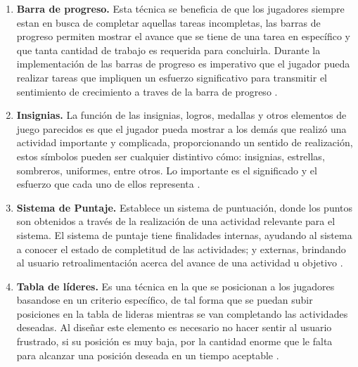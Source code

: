    \begin{enumerate} 
    \item
    {\bf Barra de progreso.}
        Esta técnica se beneficia de que los jugadores siempre estan en busca de completar aquellas
        tareas incompletas, las barras de progreso permiten mostrar el avance que se tiene de una
        tarea en específico y que tanta cantidad de trabajo es requerida para concluirla. Durante la
        implementación de las barras de progreso es imperativo que el jugador pueda realizar tareas que
        impliquen un esfuerzo significativo para transmitir el sentimiento de crecimiento a traves de
        la barra de progreso \cite[p. 113]{Octalysis}.
        
    \item
    {\bf Insignias.}
        La función de las insignias, logros, medallas y otros elementos de juego parecidos es que el
        jugador pueda mostrar a los demás que realizó una actividad importante y complicada, proporcionando
        un sentido de realización, estos símbolos pueden ser cualquier distintivo cómo: insignias,
        estrellas, sombreros, uniformes, entre otros. Lo importante es el significado y el esfuerzo
        que cada uno de ellos representa \cite[p. 117]{Octalysis}.
        
    \item
    {\bf Sistema de Puntaje.}%
        Establece un sistema de puntuación, donde los puntos son obtenidos a través de la realización
        de una actividad relevante para el sistema. El sistema de puntaje tiene finalidades internas,
        ayudando al sistema a conocer el estado de completitud de las actividades; y externas, brindando
        al usuario retroalimentación acerca del avance de una actividad u objetivo \cite[p. 118]{Octalysis}. 
        
    \item
    {\bf Tabla de líderes.}
        Es una técnica en la que se posicionan a los jugadores basandose en un criterio específico,
        de tal forma que se puedan subir posiciones en la tabla de lideras mientras se van completando
        las actividades deseadas. Al diseñar este elemento es necesario no hacer sentir al usuario
        frustrado, si su posición es muy baja, por la cantidad enorme que le falta para alcanzar
        una posición deseada en un tiempo aceptable \cite[p. 121]{Octalysis}.
    \end{enumerate}
  

\subsubsection{\principioIII} \label{subsec:prinpcioIII}
    
